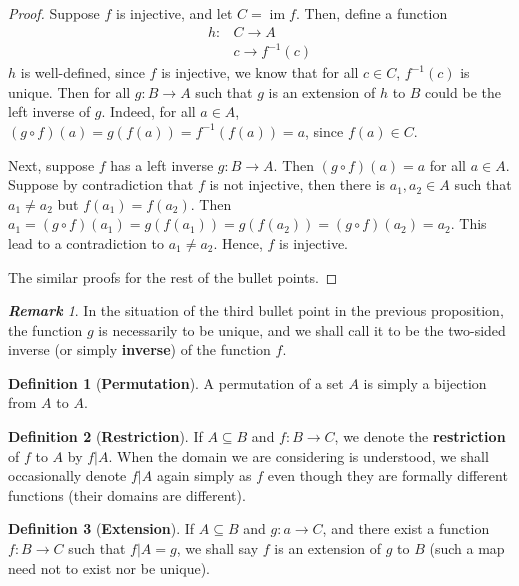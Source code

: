 \documentclass[paper=a4, fontsize=11pt]{scrartcl}
\numberwithin{equation}{section}		%
\numberwithin{figure}{section}			%
\numberwithin{table}{section}				%
\newcommand{\im}{\ensuremath{\operatorname{im}}}
\renewcommand{\to}{\ensuremath{\rightarrow}}
\theoremstyle{definition}
\newtheorem{definition}{Definition}[section]
\theoremstyle{remark}
\newtheorem*{remark}{\textbf{Remark}}
\theoremstyle{example}
\begin{document}
\begin{proof}
    Suppose $f$ is injective, and let $C = \im f$. Then, define a function 
    \begin{equation}
        \begin{aligned}
            h: &C \to A\\
            &c \to f^{-1}(c)
        \end{aligned}
    \end{equation}
    $h$ is well-defined, since $f$ is injective, we know that for all $c \in C$, $f^{-1}(c)$ is unique. Then for all $g: B \to A$ such that $g$ is an extension of $h$ to $B$ could be the left inverse of $g$. Indeed, for all $a \in A$, $(g \circ f)(a) = g(f(a)) = f^{-1}(f(a)) = a$, since $f(a) \in C$. 
    
    Next, suppose $f$ has a left inverse $g: B \to A$. Then $(g \circ f)(a) = a$ for all $a \in A$. Suppose by contradiction that $f$ is not injective, then there is $a_1, a_2 \in A$ such that $a_1 \neq a_2$ but $f(a_1) = f(a_2)$. Then $a_1 = (g \circ f)(a_1) = g(f(a_1)) = g(f(a_2)) = (g \circ f)(a_2) = a_2$. This lead to a contradiction to $a_1 \neq a_2$. Hence, $f$ is injective.
    
    The similar proofs for the rest of the bullet points.
\end{proof}

\begin{remark}
    In the situation of the third bullet point in the previous proposition, the function $g$ is necessarily to be unique, and we shall call it to be the two-sided inverse (or simply \textbf{inverse}) of the function $f$.
\end{remark}

\begin{definition}[\textbf{Permutation}]
    A permutation of a set $A$ is simply a bijection from $A$ to $A$.
\end{definition}

\begin{definition}[\textbf{Restriction}]
    If $A \subseteq B$ and $f: B \to C$, we denote the \textbf{restriction} of $f$ to $A$ by $f\lvert A$. When the domain we are considering is understood, we shall occasionally denote $f \lvert A$ again simply as $f$ even though they are formally different functions (their domains are different).
\end{definition}

\begin{definition}[\textbf{Extension}]
    If $A \subseteq B$ and $g: a \to C$, and there exist a function $f: B \to C$ such that $f\lvert A = g$, we shall say $f$ is an extension of $g$ to $B$ (such a map need not to exist nor be unique).
\end{definition}
\end{document}
